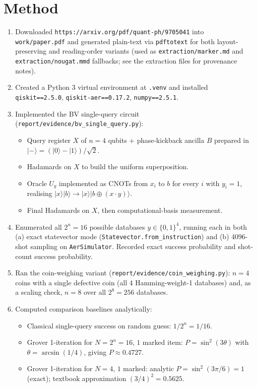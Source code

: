 \documentclass[11pt]{article}
\begin{document}
\section{Method}
\begin{enumerate}
\item Downloaded \verb|https://arxiv.org/pdf/quant-ph/9705041| into
      \verb|work/paper.pdf| and generated plain-text via \verb|pdftotext| for
      both layout-preserving and reading-order variants (used as
      \verb|extraction/marker.md| and \verb|extraction/nougat.mmd|
      fallbacks; see the extraction files for provenance notes).
\item Created a Python 3 virtual environment at \verb|.venv| and installed
      \verb|qiskit==2.5.0|, \verb|qiskit-aer==0.17.2|, \verb|numpy==2.5.1|.
\item Implemented the BV single-query circuit
      (\verb|report/evidence/bv_single_query.py|):
      \begin{itemize}
        \item Query register $X$ of $n=4$ qubits + phase-kickback ancilla $B$
              prepared in $|-\rangle = (|0\rangle-|1\rangle)/\sqrt{2}$.
        \item Hadamards on $X$ to build the uniform superposition.
        \item Oracle $U_y$ implemented as CNOTs from $x_i$ to $b$ for every
              $i$ with $y_i=1$, realising $|x\rangle|b\rangle \to
              |x\rangle|b\oplus(x\cdot y)\rangle$.
        \item Final Hadamards on $X$, then computational-basis measurement.
      \end{itemize}
\item Enumerated all $2^n=16$ possible databases $y\in\{0,1\}^4$, running each
      in both (a) exact statevector mode (\verb|Statevector.from_instruction|)
      and (b) 4096-shot sampling on \verb|AerSimulator|. Recorded exact
      success probability and shot-count success probability.
\item Ran the coin-weighing variant
      (\verb|report/evidence/coin_weighing.py|): $n=4$ coins with a single
      defective coin (all 4 Hamming-weight-1 databases) and, as a scaling
      check, $n=8$ over all $2^8=256$ databases.
\item Computed comparison baselines analytically:
      \begin{itemize}
        \item Classical single-query success on random guess: $1/2^n = 1/16$.
        \item Grover 1-iteration for $N=2^n=16$, $1$ marked item:
              $P = \sin^2(3\theta)$ with $\theta=\arcsin(1/4)$, giving
              $P \approx 0.4727$.
        \item Grover 1-iteration for $N=4$, $1$ marked: analytic
              $P = \sin^2(3\pi/6) = 1$ (exact); textbook approximation
              $(3/4)^2 = 0.5625$.
      \end{itemize}
\end{enumerate}
\end{document}
